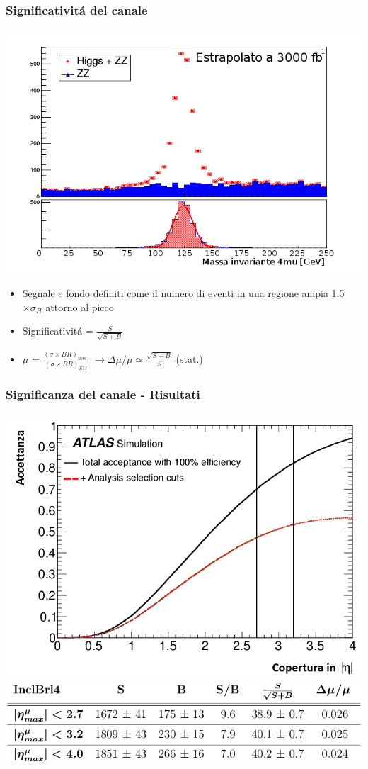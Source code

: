 \documentclass{beamer}
\begin{document}
\begin{frame}[t]
\frametitle{Significativit\'a del canale}
\begin{center}
\includegraphics[width=.5\textwidth]{SBInclBrl4_2}
\end{center}

\begin{itemize}
\item \small Segnale e fondo definiti come il numero di eventi in una regione ampia
\mbox{1.5 $\times \sigma_{H}$} attorno al picco
\item \small Significativit\'a = $\frac{S}{\sqrt{S + B}}$
\item \small $\mu$ = $\frac{(\sigma \times BR)_{mis.}}{(\sigma \times BR)_{SM}}$ $\rightarrow 
\Delta\mu/\mu \simeq \frac{\sqrt{S + B}}{S}$ (stat.)
\end{itemize}
\end{frame}


\begin{frame}
\frametitle{Significanza del canale - Risultati}
\centering
\includegraphics[width=.5\textwidth]{scopingAcceptance2}\\
\includegraphics[width=.9\textwidth]{significanceInclBrl4}
\end{frame}
\end{document}
